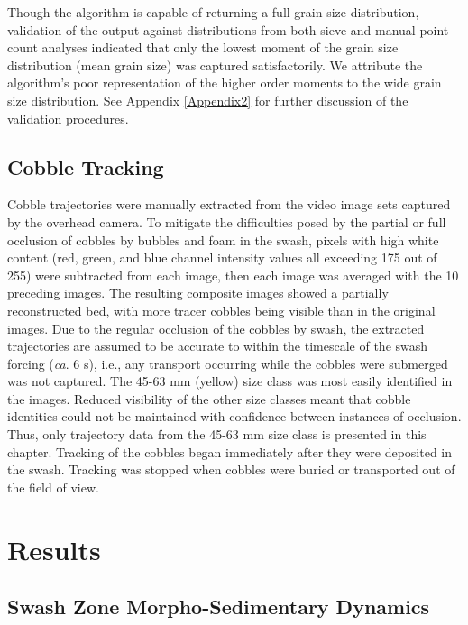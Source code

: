 Though the algorithm is capable of returning a full grain size distribution, validation of the output against distributions from both sieve and manual point count analyses \citep[see][or Appendix \ref{Appendix2} for a description of the point count method]{Barnard_etal2007, Buscombe_etal2010} indicated that only the lowest moment of the grain size distribution (mean grain size) was captured satisfactorily. We attribute the algorithm's poor representation of the higher order moments to the wide grain size distribution. See Appendix \ref{Appendix2} for further discussion of the validation procedures.


\subsection{Cobble Tracking}

Cobble trajectories were manually extracted from the video image sets captured by the overhead camera. To mitigate the difficulties posed by the partial or full occlusion of cobbles by bubbles and foam in the swash, pixels with high white content (red, green, and blue channel intensity values all exceeding 175 out of 255) were subtracted from each image, then each image was averaged with the 10 preceding images. The resulting composite images showed a partially reconstructed bed, with more tracer cobbles being visible than in the original images. Due to the regular occlusion of the cobbles by swash, the extracted trajectories are assumed to be accurate to within the timescale of the swash forcing (\textit{ca}. 6 s), i.e., any transport occurring while the cobbles were submerged was not captured. The 45-63 mm (yellow) size class was most easily identified in the images. Reduced visibility of the other size classes meant that cobble identities could not be maintained with confidence between instances of occlusion. Thus, only trajectory data from the 45-63 mm size class is presented in this chapter. Tracking of the cobbles began immediately after they were deposited in the swash. Tracking was stopped when cobbles were buried or transported out of the field of view. 


\section{Results}\label{section:results}

\subsection{Swash Zone Morpho-Sedimentary Dynamics}\label{subsection:swashMSD}

